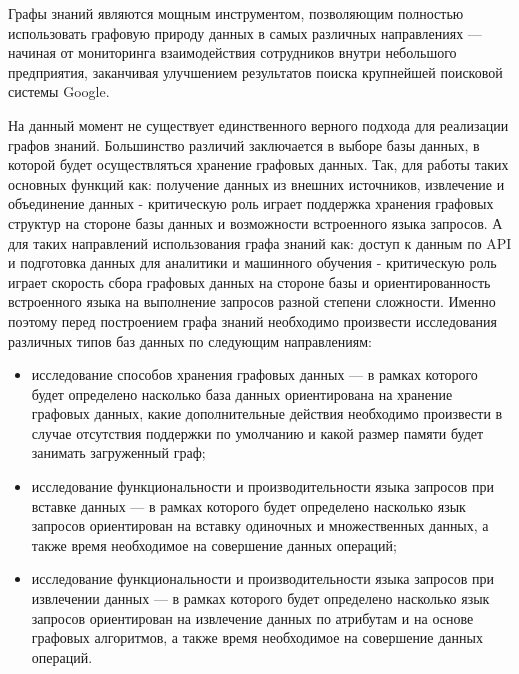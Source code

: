 Графы знаний являются мощным инструментом, позволяющим полностью использовать графовую природу данных в самых различных направлениях —
начиная от мониторинга взаимодействия сотрудников внутри небольшого предприятия, заканчивая улучшением результатов поиска крупнейшей
поисковой системы Google.

На данный момент не существует единственного верного подхода для реализации графов знаний. Большинство различий заключается в выборе базы
данных, в которой будет осуществляться хранение графовых данных. Так, для работы таких основных функций как: получение данных из внешних
источников, извлечение и объединение данных - критическую роль играет поддержка хранения графовых структур на стороне базы данных и
возможности встроенного языка запросов. А для таких направлений использования графа знаний как: доступ к данным по API и подготовка данных
для аналитики и машинного обучения - критическую роль играет скорость сбора графовых данных на стороне базы и ориентированность встроенного
языка на выполнение запросов разной степени сложности. Именно поэтому перед построением графа знаний необходимо произвести исследования
различных типов баз данных по следующим направлениям:

\begin{itemize}
    \item исследование способов хранения графовых данных — в рамках которого будет определено насколько база данных ориентирована на хранение графовых данных, какие дополнительные действия необходимо произвести в случае отсутствия поддержки по умолчанию и какой размер памяти будет занимать загруженный граф;
    \item исследование функциональности и производительности языка запросов при вставке данных — в рамках которого будет определено насколько язык запросов ориентирован на вставку одиночных и множественных данных, а также время необходимое на совершение данных операций;
    \item исследование функциональности и производительности языка запросов при извлечении данных — в рамках которого будет определено насколько язык запросов ориентирован на извлечение данных по атрибутам и на основе графовых алгоритмов, а также время необходимое на совершение данных операций.
\end{itemize}


